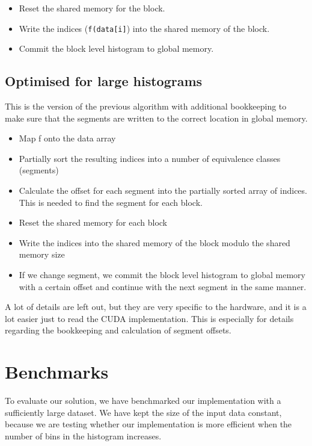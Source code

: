 \documentclass[12pt, a4paper, hidelinks]{article}
\newcommand{\fig}[3]{
\begin{figure}[h]
  \begin{center}
    \texttt{[image: ./img/\#1]}
  \end{center}
  \caption{#3}
  \label{fig:#1}
\end{figure}
}
\renewcommand{\tt}[1]{\texttt{#1}}
\begin{document}
\begin{itemize}
\item Reset the shared memory for the block.
\item Write the indices (\tt{f(data[i]}) into the shared memory of the block.
\item Commit the block level histogram to global memory.
\end{itemize}

\subsection{Optimised for large histograms}
This is the version of the previous algorithm with additional bookkeeping
to make sure that the segments are written to the correct location in global memory.

\begin{itemize}
\item
  Map f onto the data array
\item
  Partially sort the resulting indices into a number of equivalence classes (segments)
\item
  Calculate the offset for each segment into
  the partially sorted array of indices.
  This is needed to find the segment for each block.
\item
  Reset the shared memory for each block
\item
  Write the indices into the shared memory of the block modulo the shared memory size
\item
  If we change segment,
  we commit the block level histogram to global memory with a certain
  offset and continue with the next segment in the same manner.
\end{itemize}

A lot of details are left out, but they are very specific to the hardware,
and it is a lot easier just to read the CUDA implementation.
This is especially for details regarding the bookkeeping and calculation
of segment offsets.

\section{Benchmarks}
To evaluate our solution, we have benchmarked our implementation with
a sufficiently large dataset.
We have kept the size of the input data constant,
because we are testing whether our implementation is more
efficient when the number of bins in the histogram increases.

\end{document}
